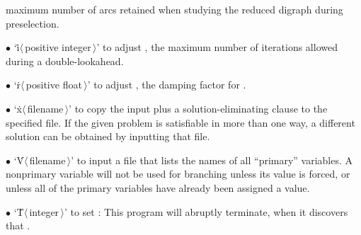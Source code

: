 maximum number of arcs retained when studying the reduced digraph during
preselection.
\item{$\bullet$}
`\.i$\langle\,$positive integer$\,\rangle$' to adjust ,
the
maximum number of iterations allowed during a double-lookahead.
\item{$\bullet$}
`\.r$\langle\,$positive float$\,\rangle$' to adjust , the
damping factor for .
\item{$\bullet$}
`\.x$\langle\,$filename$\,\rangle$' to copy the input plus a
solution-eliminating clause to the specified file. If the given problem is
satisfiable in more than one way, a different solution can be obtained by
inputting that file.
\item{$\bullet$}
`\.V$\langle\,$filename$\,\rangle$' to input a file that lists the names
of all ``primary'' variables. A nonprimary variable will not be used for
branching unless its value is forced, or unless all of the primary variables
have already been assigned a value.
\item{$\bullet$}
`\.T$\langle\,$integer$\,\rangle$' to set : This program will
abruptly terminate, when it discovers that .

